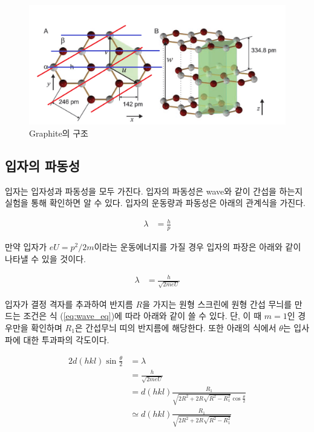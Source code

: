 \documentclass[%
 reprint,
 amsmath,amssymb,
 aps,
]{revtex4-2}
\begin{document}
\begin{figure}[htbp]
	\includegraphics[width = 0.95\linewidth]{Graphite.png}%
	\caption{\label{fig:Graphite}Graphite의 구조}
\end{figure}

\subsection{\label{sec:level2}입자의 파동성}
입자는 입자성과 파동성을 모두 가진다. 입자의 파동성은 wave와 같이 간섭을 하는지 실험을 통해 확인하면 알 수 있다. 입자의 운동량과 파동성은 아래의 관계식을 가진다.

\begin{align}
	\lambda &= \frac{h}{p}
\end{align}

만약 입자가 $eU=p^{2}/2m$이라는 운동에너지를 가질 경우 입자의 파장은 아래와 같이 나타낼 수 있을 것이다.

\begin{align}
	\lambda &= \frac{h}{\sqrt{2meU}}
\end{align}

입자가 결정 격자를 추과하여 반지름 $R$을 가지는 원형 스크린에 원형 간섭 무늬를 만드는 조건은 식 (\ref{eq:wave_eq})에 따라 아래와 같이 쓸 수 있다. 단, 이 때 $m=1$인 경우만을 확인하며 $R_{1}$은 간섭무늬 띠의 반지름에 해당한다. 또한 아래의 식에서 $\theta$는 입사파에 대한 투과파의 각도이다.

\begin{align}
	2d(hkl) \sin \frac{\theta}{2} &= \lambda\\
	&=\frac{h}{\sqrt{2meU}}\\
	&=d(hkl)\frac{R_{1}}{\sqrt{2R^{2} + 2R\sqrt{R^{2} - R_{1}^{2}}}\cos \frac{\theta}{2}}\\
	&\simeq d(hkl)\frac{R_{1}}{\sqrt{2R^{2} + 2R\sqrt{R^{2} - R_{1}^{2}}}}
\end{align}
\end{document}
